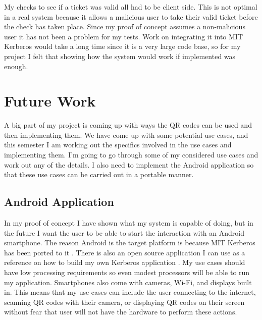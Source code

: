 \documentclass[]{report}   %
\begin{document}
My checks to see if a ticket was valid all had to be client side. This is not optimal in a real system because it allows a malicious user to take their valid ticket before the check has taken place. Since my proof of concept assumes a non-malicious user it has not been a problem for my tests. Work on integrating it into MIT Kerberos would take a long time since it is a very large code base, so for my project I felt that showing how the system would work if implemented was enough.



\section{Future Work}
A big part of my project is coming up with ways the QR codes can be used and then implementing them. We have come up with some potential use cases, and this semester I am working out the specifics involved in the use cases and implementing them. I’m going to go through some of my considered use cases and work out any of the details. I also need to implement the Android application so that these use cases can be carried out in a portable manner.

\subsection{Android Application}
In my proof of concept I have shown what my system is capable of doing, but in the future I want the user to be able to start the interaction with an Android smartphone. The reason Android is the target platform is because MIT Kerberos has been ported to it \cite{KerbDroid}. There is also an open source application I can use as a reference on how to build my own Kerberos application \cite{KerbApp}. My use cases should have low processing requirements so even modest processors will be able to run my application. Smartphones also come with cameras, Wi-Fi, and displays built in. This means that my use cases can include the user connecting to the internet, scanning QR codes with their camera, or displaying QR codes on their screen without fear that user will not have the hardware to perform these actions.
\end{document}
